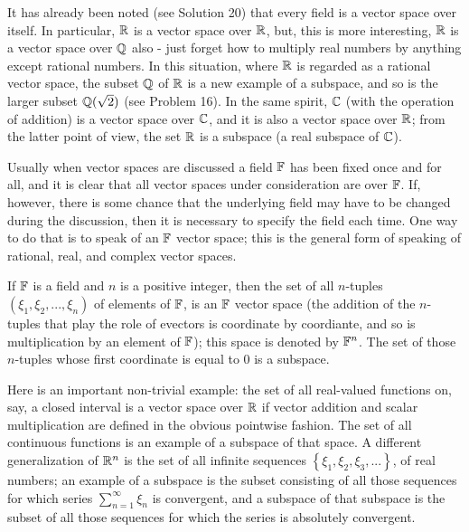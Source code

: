 It has already been noted (see Solution 20) that every field is a vector space over itself. In particular, $\mathbb{R}$ is a vector space over $\mathbb{R}$, but, this is more interesting, $\mathbb{R}$ is a vector space over $\mathbb{Q}$ also - just forget how to multiply real numbers by anything except rational numbers. In this situation, where $\mathbb{R}$ is regarded as a rational vector space, the subset $\mathbb{Q}$ of $\mathbb{R}$ is a new example of a subspace, and so is the larger subset $\mathbb{Q}(\sqrt{2})$ (see Problem 16). In the same spirit, $\mathbb{C}$ (with the operation of addition) is a vector space over $\mathbb{C}$, and it is also a vector space over $\mathbb{R}$; from the latter point of view, the set $\mathbb{R}$ is a subspace (a real subspace of $\mathbb{C}$).

Usually when vector spaces are discussed a field $\mathbb{F}$ has been fixed once and for all, and it is clear that all vector spaces under consideration are over $\mathbb{F}$. If, however, there is some chance that the underlying field may have to be changed during the discussion, then it is necessary to specify the field each time. One way to do that is to speak of an $\mathbb{F}$ vector space; this is the general form of speaking of rational, real, and complex vector spaces.

If $\mathbb{F}$ is a field and $n$ is a positive integer, then the set of all $n$-tuples $(\xi_1, \xi_2, ..., \xi_n)$ of elements of $\mathbb{F}$, is an $\mathbb{F}$ vector space (the addition of the $n$-tuples that play the role of evectors is coordinate by coordiante, and so is multiplication by an element of $\mathbb{F}$); this space is denoted by $\mathbb{F}^n$. The set of those $n$-tuples whose first coordinate is equal to $0$ is a subspace.

Here is an important non-trivial example: the set of all real-valued functions on, say, a closed interval is a vector space over $\mathbb{R}$ if vector addition and scalar multiplication are defined in the obvious pointwise fashion. The set of all continuous functions is an example of a subspace of that space. A different generalization of $\mathbb{R}^n$ is the set of all infinite sequences $\left\{ \xi_1, \xi_2, \xi_3,... \right\}$, of real numbers; an example of a subspace is the subset consisting of all those sequences for which series $\sum_{n=1}^{\infty} \xi_n$ is convergent, and a subspace of that subspace is the subset of all those sequences for which the series is absolutely convergent.

